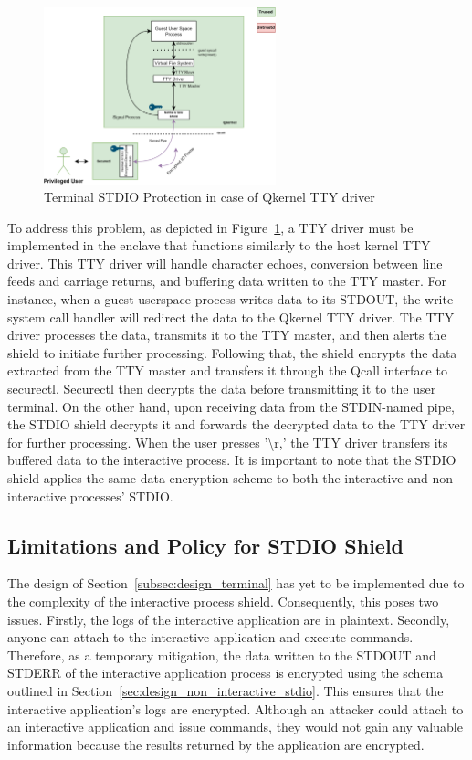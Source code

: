 \begin{figure}[!htb]
    \centering
    \includegraphics[width=0.6\textwidth]{images/terminal_shiled3.png}
    \caption[Terminal STDIO Protection in case of using Qkernel TTY driver]{Terminal STDIO Protection in case of Qkernel TTY driver}
    \label{fig:terminal_shiled3}
\end{figure}

To address this problem, as depicted in Figure~\ref{fig:terminal_shiled3}, a TTY driver must be implemented in the enclave that functions similarly to the host kernel TTY driver. This TTY driver will handle character echoes, conversion between line feeds and carriage returns, and buffering data written to the TTY master. For instance, when a guest userspace 
process writes data to its STDOUT, the write system call handler will redirect the data to the Qkernel TTY driver. The TTY driver processes the data, transmits it to the TTY master, and then alerts the shield to initiate further processing. Following that, the shield encrypts the data extracted from the TTY master and transfers it through the Qcall interface to 
securectl.  Securectl then decrypts the data before transmitting it to the user terminal. On the other hand, upon receiving data from the STDIN-named pipe, the STDIO shield decrypts it and forwards the decrypted data to the TTY driver for further processing. When the user presses '\textbackslash r,' the TTY driver transfers its buffered data to the interactive process. It is important to note 
that the STDIO shield applies the same data encryption scheme to both the interactive and non-interactive processes' STDIO.

\subsection{Limitations and Policy for STDIO Shield}
The design of Section~\ref{subsec:design_terminal} has yet to be implemented due to the complexity of the interactive process shield. Consequently, this poses two issues. Firstly, the logs of the interactive application are in plaintext. Secondly, anyone can attach to the interactive application and execute commands. Therefore, as a temporary mitigation, the data written to the STDOUT 
and STDERR of the interactive application process is encrypted using the schema outlined in Section~\ref{sec:design_non_interactive_stdio}. This ensures that the interactive application's logs are encrypted. Although an attacker could attach to an interactive application and issue commands, they would not gain any valuable information because the results returned by the application are encrypted.
 
